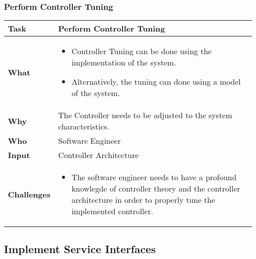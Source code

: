 \subsubsection{Perform Controller Tuning}
	\begin{tabularx}{\textwidth}{@{} l X @{}}
		\caption{Perform Controller Tuning} \label{table:ch6_Task_Perform_Controller_Tuning} \\
		\toprule 
		\bfseries Task & Perform Controller Tuning\\
		\midrule 
		\bfseries What & 
		\begin{itemize}
			\item Controller Tuning can be done using the implementation of the system.
			\item Alternatively, the tuning can done using a model of the system.
		\end{itemize}
		\\
		\midrule 
		\bfseries Why & The Controller needs to be adjusted to the system characteristics.\\
		\midrule 
		\bfseries Who & Software Engineer\\
		\midrule 
		\bfseries Input & Controller Architecture\\
		\midrule 
		\bfseries Challenges & 
		\begin{itemize}
			\item The software engineer needs to have a profound knowlegde of controller theory and the controller architecture in order to properly tune the implemented controller.
		\end{itemize}
		\\
		\bottomrule 
	\end{tabularx}


\subsection{Implement Service Interfaces}

